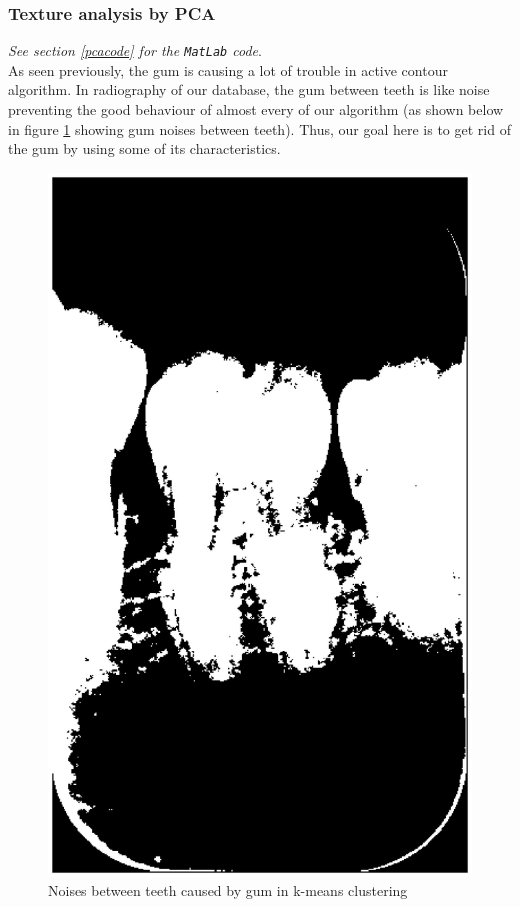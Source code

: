 \subsubsection*{Texture analysis by PCA}
\textit{See section \ref{pcacode} for the \texttt{MatLab} code}.\\
As seen previously, the gum is causing a lot of trouble in active contour algorithm. In radiography of our database, the gum between teeth is like noise preventing the good behaviour of almost every of our algorithm (as shown below in figure \ref{noisePCA} showing gum noises between teeth). Thus, our goal here is to get rid of the gum by using some of its characteristics.
\begin{figure}[H]
\centering
\includegraphics[scale=0.5]{images/noisePCA.eps}
\caption{Noises between teeth caused by gum in k-means clustering}
\label{noisePCA}
\end{figure}
